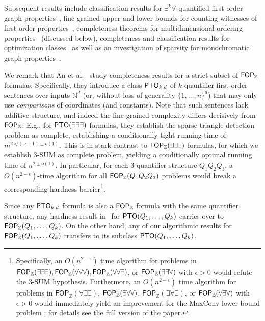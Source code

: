 Subsequent results include classification results for $\exists^k \forall$-quantified first-order graph properties~\cite{DBLP:conf/coco/BringmannFK19}, fine-grained upper and lower bounds for counting witnesses of first-order properties~\cite{DBLP:conf/icalp/DellRW19}, completeness theorems for multidimensional ordering properties~\cite{DBLP:journals/algorithmica/AnGIJKN22} (discussed below), completeness and classification results for optimization classes~\cite{DBLP:conf/approx/BringmannCFK21,DBLP:conf/icalp/BringmannCFK22} as well as an investigation of sparsity for monochromatic graph properties~\cite{FischerKR24}.

We remark that An et al.~\cite{DBLP:journals/algorithmica/AnGIJKN22} study completeness results for a strict subset of $\mathsf{FOP}_{\mathbb{Z}}$ formulas: Specifically, they introduce a class $\mathsf{PTO}_{k,d}$ of $k$-quantifier first-order sentences over inputs $\mathbb{N}^d$ (or, without loss of generality $\{1,\dots, n\}^d$) that may only use \emph{comparisons} of coordinates (and constants).
Note that such sentences lack additive structure, and indeed the fine-grained complexity differs decisively from $\mathsf{FOP}_{\mathbb{Z}}$: E.g., for $\mathsf{PTO}(\exists \exists \exists)$ formulas, they establish the sparse triangle detection problem as complete,  establishing a conditionally tight running time of $m^{2\omega/(\omega+1)\pm o(1)}$.
This is in stark contrast to $\mathsf{FOP}_{\mathbb{Z}}(\exists \exists \exists)$ formulas, for which we establish $3$-SUM as complete problem, yielding a conditionally optimal running time of $n^{2\pm o(1)}$. In particular, for each 3-quantifier structure $Q_1Q_2Q_3$, a $O(n^{2-\epsilon})$-time algorithm for all $\mathsf{FOP}_{\mathbb{Z}}(Q_1Q_2Q_3)$ problems would break a corresponding hardness barrier\footnote{Specifically, an $O(n^{2-\epsilon})$ time algorithm for problems in $\mathsf{FOP}_{\mathbb{Z}}(\exists \exists \exists), \mathsf{FOP}_{\mathbb{Z}}(\forall \forall \forall), \mathsf{FOP}_{\mathbb{Z}}(\forall \forall \exists)$, or $\mathsf{FOP}_{\mathbb{Z}}(\exists \exists \forall)$ with $\epsilon>0$ would
refute the $3$-SUM hypothesis.
Furthermore, an $O(n^{2-\epsilon})$ time algorithm for problems in $\mathsf{FOP}_{\mathbb{Z}}(\forall \exists \exists)$, $\mathsf{FOP}_{\mathbb{Z}}(\exists \forall \forall)$, $\mathsf{FOP}_{\mathbb{Z}}(\exists \forall \exists)$, or $\mathsf{FOP}_{\mathbb{Z}}(\forall \exists \forall)$ with $\epsilon>0$ would
immediately yield an improvement for the MaxConv lower bound problem \cite{DBLP:journals/talg/CyganMWW19}; for details see the full version of the paper.}.




Since any $\mathsf{PTO}_{k,d}$ formula is also a $\mathsf{FOP}_{\mathbb{Z}}$ formula with the same quantifier structure, any hardness result in~\cite{DBLP:journals/algorithmica/AnGIJKN22} for $\mathsf{PTO}(Q_1, \dots, Q_k)$ carries over to $\mathsf{FOP}_{\mathbb{Z}}(Q_1,\dots, Q_k)$. On the other hand, any of our algorithmic results for $\mathsf{FOP}_{\mathbb{Z}}(Q_1,\dots, Q_k)$ transfers to its subclass $\mathsf{PTO}(Q_1,\dots, Q_k)$.



